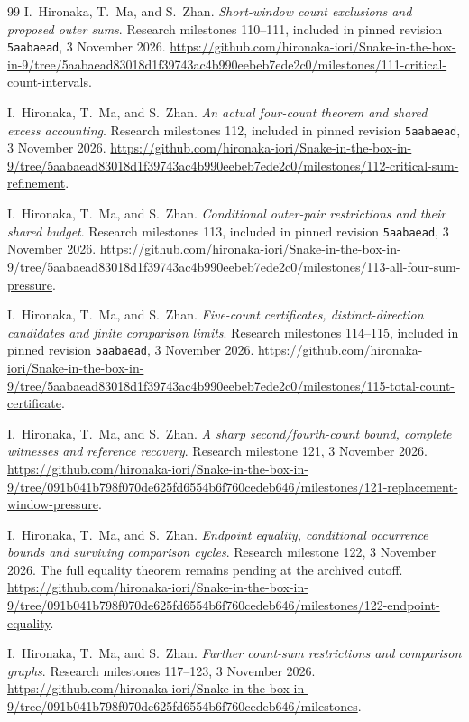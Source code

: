 \documentclass[11pt,a4paper]{article}
\theoremstyle{definition}
\theoremstyle{remark}
\begin{document}
\begin{thebibliography}{99}
I.~Hironaka, T.~Ma, and S.~Zhan. \emph{Short-window count exclusions and proposed outer sums}. Research milestones 110--111, included in pinned revision \texttt{5aabaead}, 3 November 2026.
\url{https://github.com/hironaka-iori/Snake-in-the-box-in-9/tree/5aabaead83018d1f39743ac4b990eebeb7ede2c0/milestones/111-critical-count-intervals}.

I.~Hironaka, T.~Ma, and S.~Zhan. \emph{An actual four-count theorem and shared excess accounting}. Research milestones 112, included in pinned revision \texttt{5aabaead}, 3 November 2026.
\url{https://github.com/hironaka-iori/Snake-in-the-box-in-9/tree/5aabaead83018d1f39743ac4b990eebeb7ede2c0/milestones/112-critical-sum-refinement}.

I.~Hironaka, T.~Ma, and S.~Zhan. \emph{Conditional outer-pair restrictions and their shared budget}. Research milestones 113, included in pinned revision \texttt{5aabaead}, 3 November 2026.
\url{https://github.com/hironaka-iori/Snake-in-the-box-in-9/tree/5aabaead83018d1f39743ac4b990eebeb7ede2c0/milestones/113-all-four-sum-pressure}.

I.~Hironaka, T.~Ma, and S.~Zhan. \emph{Five-count certificates, distinct-direction candidates and finite comparison limits}. Research milestones 114--115, included in pinned revision \texttt{5aabaead}, 3 November 2026.
\url{https://github.com/hironaka-iori/Snake-in-the-box-in-9/tree/5aabaead83018d1f39743ac4b990eebeb7ede2c0/milestones/115-total-count-certificate}.

I.~Hironaka, T.~Ma, and S.~Zhan. \emph{A sharp second/fourth-count bound, complete witnesses and reference recovery}. Research milestone 121, 3 November 2026.
\url{https://github.com/hironaka-iori/Snake-in-the-box-in-9/tree/091b041b798f070de625fd6554b6f760cedeb646/milestones/121-replacement-window-pressure}.

I.~Hironaka, T.~Ma, and S.~Zhan. \emph{Endpoint equality, conditional occurrence bounds and surviving comparison cycles}. Research milestone 122, 3 November 2026. The full equality theorem remains pending at the archived cutoff.
\url{https://github.com/hironaka-iori/Snake-in-the-box-in-9/tree/091b041b798f070de625fd6554b6f760cedeb646/milestones/122-endpoint-equality}.

I.~Hironaka, T.~Ma, and S.~Zhan. \emph{Further count-sum restrictions and comparison graphs}. Research milestones 117--123, 3 November 2026.
\url{https://github.com/hironaka-iori/Snake-in-the-box-in-9/tree/091b041b798f070de625fd6554b6f760cedeb646/milestones}.


\end{thebibliography}
\end{document}
